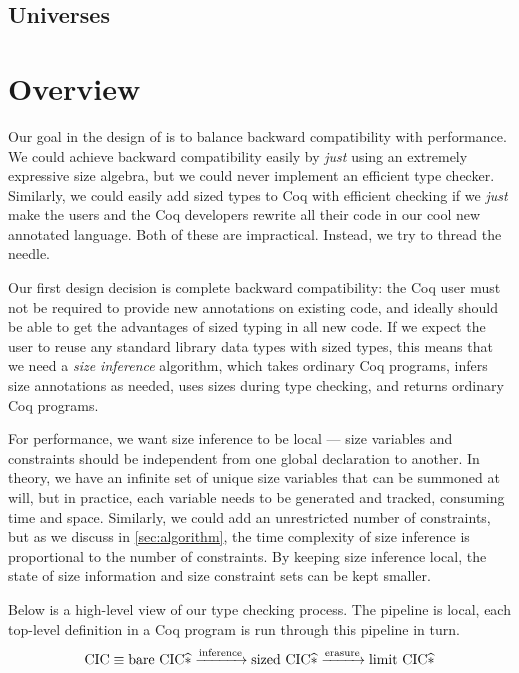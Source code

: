 \subsection{Universes}


\section{Overview}\label{sec:sponge-cake}
Our goal in the design of \lang is to balance backward compatibility with performance.
We could achieve backward compatibility easily by \emph{just} using an extremely expressive size algebra, but we could never implement an efficient type checker.
Similarly, we could easily add sized types to Coq with efficient checking if we \emph{just} make the users and the Coq developers rewrite all their code in our cool new annotated language.
Both of these are impractical.
Instead, we try to thread the needle.

Our first design decision is complete backward compatibility: the Coq user must not be required to provide new annotations on existing code, and ideally should be able to get the advantages of sized typing in all new code.
If we expect the user to reuse any standard library data types with sized types, this means that we need a \emph{size inference} algorithm, which takes ordinary Coq programs, infers size annotations as needed, uses sizes during type checking, and returns ordinary Coq programs.

For performance, we want size inference to be local --- size variables and constraints should be independent from one global declaration to another.
In theory, we have an infinite set of unique size variables that can be summoned at will, but in practice, each variable needs to be generated and tracked, consuming time and space.
Similarly, we could add an unrestricted number of constraints, but as we discuss in \autoref{sec:algorithm}, the time complexity of size inference is proportional to the number of constraints.
By keeping size inference local, the state of size information and size constraint sets can be kept smaller.

Below is a high-level view of our type checking process.
The pipeline is local, \ie each top-level definition in a Coq program is run through this pipeline in turn.
\begin{equation*}
  \text{CIC} \equiv \text{bare CIC$\widehat{\ast}$} \xrightarrow{\text{inference}} \text{sized CIC$\widehat{\ast}$} \xrightarrow{\text{erasure}} \text{limit CIC$\widehat{\ast}$}
\end{equation*}

